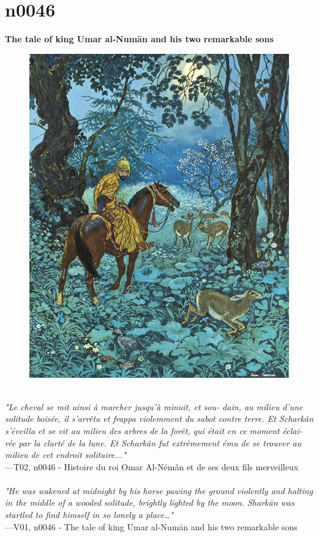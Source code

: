 \documentclass[../Carre_nights.tex]{subfiles}
\begin{document}
\section{n0046}
\textbf{\Large{The tale of king Umar al-Num\=an and his two remarkable sons}} \\

\begin{figure}[ht]
\centering
\includegraphics[height=\figsize]{illustrations/volume_2/T02, n0046 - Histoire du roi Omar Al-Némân et de ses deux fils merveilleux.jpg}
\end{figure}

\textit{\\
"Le cheval se mit ainsi à marcher jusqu’à minuit, et sou- dain, au milieu d’une solitude boisée, il s’arrêta et frappa violemment du sabot contre terre. Et Scharkân s’éveilla et se vit au milieu des arbres de la forêt, qui était en ce moment éclai- rée par la clarté de la lune. Et Scharkân fut extrêmement ému de se trouver au milieu de cet endroit solitaire..."} \\
—T02, n0046 - Histoire du roi Omar Al-Némân et de ses deux fils merveilleux \\~\\
\textit{"He was wakened at midnight by his horse pawing the ground violently and halting in the middle of a wooded solitude, brightly lighted by the moon. Shark\=an was startled to find himself in so lonely a place…"} \\
—V01, n0046 - The tale of king Umar al-Num\=an and his two remarkable sons
\end{document}
